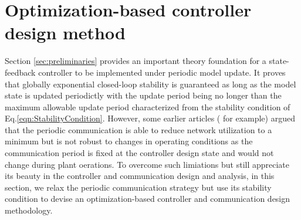 \documentclass[letterpaper, 10 pt, conference]{ieeeconf}\IEEEoverridecommandlockouts%
\begin{document}
\section{Optimization-based controller design method}
Section \ref{sec:preliminaries} provides an important theory foundation for a state-feedback controller to be implemented under periodic model update. It proves that globally exponential closed-loop stability is guaranteed as long as the model state is updated periodictly with the update period being no longer than the maximum allowable update period characterized from the stability condition of Eq.\ref{eqn:StabilityCondition}. However, some earlier articles (\cite{sun2010quasi,xue2016supervisory} for example)  argued that the periodic communication is able to reduce network utilization to a minimum but is not robust to changes in operating conditions as the communication period is fixed at the controller design state and would not change during plant oerations. To overcome such limiations but still appreciate its beauty in the controller and communication design and analysis, in this section, we relax the periodic communication strategy but use its stability condition to devise an optimization-based controller and communication design methodology.
\end{document}

